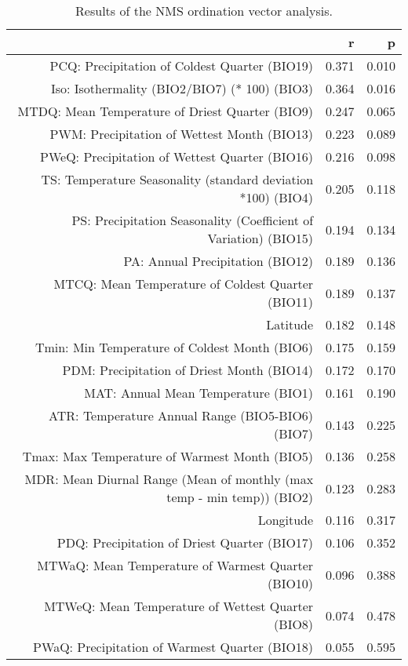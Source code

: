 \begin{table}[ht]
\centering
\begin{tabular}{rrr}
  \hline
 & r & p \\ 
  \hline
PCQ: Precipitation of Coldest Quarter (BIO19) & 0.371 & 0.010 \\ 
  Iso: Isothermality (BIO2/BIO7) (* 100) (BIO3) & 0.364 & 0.016 \\ 
  MTDQ: Mean Temperature of Driest Quarter (BIO9) & 0.247 & 0.065 \\ 
  PWM: Precipitation of Wettest Month (BIO13) & 0.223 & 0.089 \\ 
  PWeQ: Precipitation of Wettest Quarter (BIO16) & 0.216 & 0.098 \\ 
  TS: Temperature Seasonality (standard deviation *100) (BIO4) & 0.205 & 0.118 \\ 
  PS: Precipitation Seasonality (Coefficient of Variation) (BIO15) & 0.194 & 0.134 \\ 
  PA: Annual Precipitation (BIO12) & 0.189 & 0.136 \\ 
  MTCQ: Mean Temperature of Coldest Quarter (BIO11) & 0.189 & 0.137 \\ 
  Latitude & 0.182 & 0.148 \\ 
  Tmin: Min Temperature of Coldest Month (BIO6) & 0.175 & 0.159 \\ 
  PDM: Precipitation of Driest Month (BIO14) & 0.172 & 0.170 \\ 
  MAT: Annual Mean Temperature (BIO1) & 0.161 & 0.190 \\ 
  ATR: Temperature Annual Range (BIO5-BIO6) (BIO7) & 0.143 & 0.225 \\ 
  Tmax: Max Temperature of Warmest Month (BIO5) & 0.136 & 0.258 \\ 
  MDR: Mean Diurnal Range (Mean of monthly (max temp - min temp)) (BIO2) & 0.123 & 0.283 \\ 
  Longitude & 0.116 & 0.317 \\ 
  PDQ: Precipitation of Driest Quarter (BIO17) & 0.106 & 0.352 \\ 
  MTWaQ: Mean Temperature of Warmest Quarter (BIO10) & 0.096 & 0.388 \\ 
  MTWeQ: Mean Temperature of Wettest Quarter (BIO8) & 0.074 & 0.478 \\ 
  PWaQ: Precipitation of Warmest Quarter (BIO18) & 0.055 & 0.595 \\ 
   \hline
\end{tabular}
\caption{Results of the NMS ordination vector analysis.} 
\label{tab:wc_vec}
\end{table}

